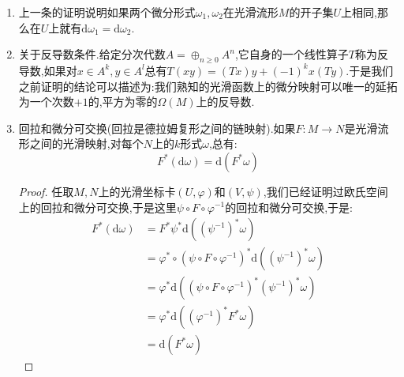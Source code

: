 \begin{enumerate}
\begin{proof}
    	现在任取$\omega\in\Omega^k(M)$,任取$M$上的光滑坐标卡$(U,\varphi)$,那么$\omega$有坐标表示$\sum_I\omega_I\mathrm{d}x^I$,这里$I$取遍递增的重指标.任取$p\in U$,按照光滑碰撞函数的存在性,我们可以构造$M$上的$\widetilde{\omega_I}$和$\widetilde{x}^i$,使得它们在$p$的附近和$\omega_I$与$x^i$一致.那么按照$\mathrm{d}$的这些条件以及上一段,说明在点$p$有$\mathrm{d}(\sum_J\omega_J\mathrm{d}x^J)=\sum_J\mathrm{d}\omega_J\wedge\mathrm{d}x^J$,这说明了唯一性.
    \end{proof}
    \item 上一条的证明说明如果两个微分形式$\omega_1,\omega_2$在光滑流形$M$的开子集$U$上相同,那么在$U$上就有$\mathrm{d}\omega_1=\mathrm{d}\omega_2$.
    \item 关于反导数条件.给定分次代数$A=\oplus_{n\ge0}A^n$,它自身的一个线性算子$T$称为反导数,如果对$x\in A^k,y\in A^l$总有$T(xy)=(Tx)y+(-1)^kx(Ty)$.于是我们之前证明的结论可以描述为:我们熟知的光滑函数上的微分映射可以唯一的延拓为一个次数$+1$的,平方为零的$\Omega(M)$上的反导数.
    \item 回拉和微分可交换(回拉是德拉姆复形之间的链映射).如果$F:M\to N$是光滑流形之间的光滑映射,对每个$N$上的$k$形式$\omega$,总有:
    $$F^*(\mathrm{d}\omega)=\mathrm{d}(F^*\omega)$$
    \begin{proof}
    	
    	任取$M,N$上的光滑坐标卡$(U,\varphi)$和$(V,\psi)$,我们已经证明过欧氏空间上的回拉和微分可交换,于是这里$\psi\circ F\circ\varphi^{-1}$的回拉和微分可交换,于是:
    	\begin{align*}
    	F^*(\mathrm{d}\omega)&=F^*\psi^*\mathrm{d}((\psi^{-1})^*\omega)\\&=\varphi^*\circ(\psi\circ F\circ\varphi^{-1})^*\mathrm{d}((\psi^{-1})^*\omega)\\&=\varphi^*\mathrm{d}((\psi\circ F\circ\varphi^{-1})^*(\psi^{-1})^*\omega)\\&=\varphi^*\mathrm{d}((\varphi^{-1})^*F^*\omega)\\&=\mathrm{d}(F^*\omega)
    	\end{align*}
    \end{proof}
\end{enumerate}

